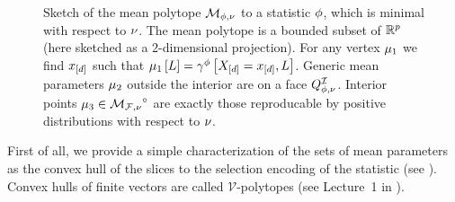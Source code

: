 
\begin{figure}[t!]
    \begin{center}
        
    \end{center}
    \caption{Sketch of the mean polytope ${\mathcal{M}_{\phi,\nu}}$ to a statistic $\phi$, which is minimal with respect to $\nu$.
    The mean polytope is a bounded subset of $\mathbb{R}^{p}$ (here sketched as a 2-dimensional projection). %
    For any vertex $\mu_{1}$ we find $x_{[d]}$ such that $\mu_{1}\left[L\right]=\gamma^{\phi}\left[X_{[d]}=x_{[d]},L\right]$.
    Generic mean parameters $\mu_{2}$ outside the interior are on a face $Q^{\mathcal{I}}_{\phi,\nu}$. %
    Interior points $\mu_{3}\in{\mathcal{M}_{\mathcal{F},\nu}}^{\circ}$ are exactly those reproducable by positive distributions with respect to $\nu$.  %
    }\label{fig:meansetSketchGeneric}
\end{figure}

First of all, we provide a simple characterization of the sets of mean parameters as the convex hull of the slices to the selection encoding of the statistic (see ).
Convex hulls of finite vectors are called $\mathcal{V}$-polytopes (see Lecture~1 in \cite{ziegler_lectures_2013}).

